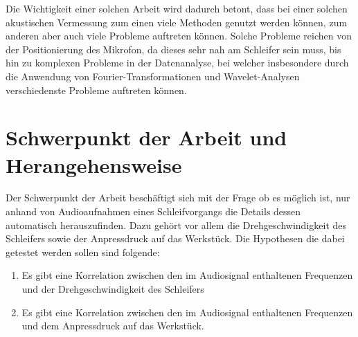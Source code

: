 Die Wichtigkeit einer solchen Arbeit wird dadurch betont, dass bei einer solchen akustischen Vermessung zum einen viele Methoden genutzt werden können, zum anderen aber auch viele Probleme auftreten können. Solche Probleme reichen von der Positionierung des Mikrofon, da dieses sehr nah am Schleifer sein muss, bis hin zu komplexen Probleme in der Datenanalyse, bei welcher insbesondere durch die Anwendung von Fourier-Transformationen und Wavelet-Analysen verschiedenste Probleme auftreten können. 

\section{Schwerpunkt der Arbeit und Herangehensweise}

Der Schwerpunkt der Arbeit beschäftigt sich mit der Frage ob es möglich ist, nur anhand von Audioaufnahmen eines Schleifvorgangs die Details dessen automatisch herauszufinden. Dazu gehört vor allem die Drehgeschwindigkeit des Schleifers sowie der Anpressdruck auf das Werkstück. Die Hypothesen die dabei getestet werden sollen sind folgende:
\begin{enumerate}
    \item Es gibt eine Korrelation zwischen den im Audiosignal enthaltenen Frequenzen und der Drehgeschwindigkeit des Schleifers
    \item Es gibt eine Korrelation zwischen den im Audiosignal enthaltenen Frequenzen und dem Anpressdruck auf das Werkstück.
\end{enumerate}


